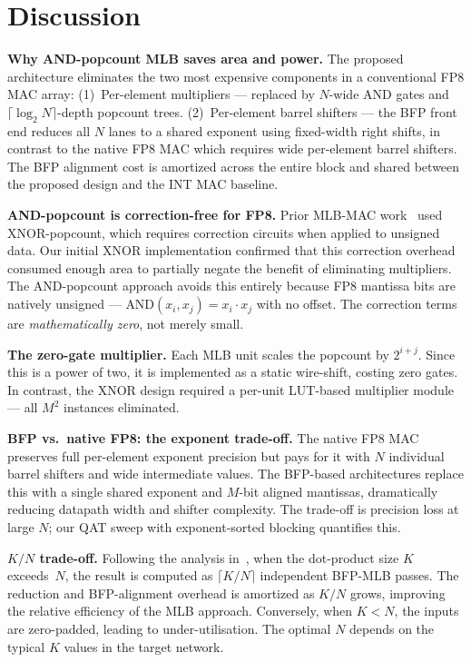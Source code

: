 \documentclass[conference]{IEEEtran}
\begin{document}
\section{Discussion}

\textbf{Why AND-popcount MLB saves area and power.}
The proposed architecture eliminates the two most expensive
components in a conventional FP8 MAC array:
(1)~Per-element multipliers --- replaced by $N$-wide AND gates
and $\lceil\log_2 N\rceil$-depth popcount trees.
(2)~Per-element barrel shifters --- the BFP front end reduces
all $N$ lanes to a shared exponent using fixed-width right shifts,
in contrast to the native FP8 MAC which requires wide per-element
barrel shifters.  The BFP alignment cost is amortized across the
entire block and shared between the proposed design and the INT
MAC baseline.

\textbf{AND-popcount is correction-free for FP8.}
Prior MLB-MAC work~\cite{b1} used XNOR-popcount, which
requires correction circuits when applied to unsigned data.  Our
initial XNOR implementation confirmed that this correction overhead
consumed enough area to partially negate the benefit of eliminating
multipliers.  The AND-popcount approach avoids this entirely because
FP8 mantissa bits are natively unsigned ---
$\text{AND}(x_i, x_j) = x_i \cdot x_j$ with no offset.
The correction terms are \emph{mathematically zero}, not merely
small.

\textbf{The zero-gate multiplier.}
Each MLB unit scales the popcount by $2^{i+j}$.  Since this is a
power of two, it is implemented as a static wire-shift, costing
zero gates.  In contrast, the XNOR design required a per-unit
LUT-based multiplier module --- all $M^2$ instances eliminated.

\textbf{BFP vs.\ native FP8: the exponent trade-off.}
The native FP8 MAC preserves full per-element exponent precision
but pays for it with $N$ individual barrel shifters and wide
intermediate values.  The BFP-based architectures replace this
with a single shared exponent and $M$-bit aligned mantissas,
dramatically reducing datapath width and shifter complexity.  The
trade-off is precision loss at large $N$; our QAT sweep with
exponent-sorted blocking quantifies this.

\textbf{$K/N$ trade-off.}
Following the analysis in~\cite{b1}, when the dot-product size $K$
exceeds~$N$, the result is computed as $\lceil K/N \rceil$
independent BFP-MLB passes.  The reduction and BFP-alignment
overhead is amortized as $K/N$ grows, improving the relative
efficiency of the MLB approach.  Conversely, when $K < N$, the
inputs are zero-padded, leading to under-utilisation.  The optimal
$N$ depends on the typical $K$ values in the target network.
\end{document}
